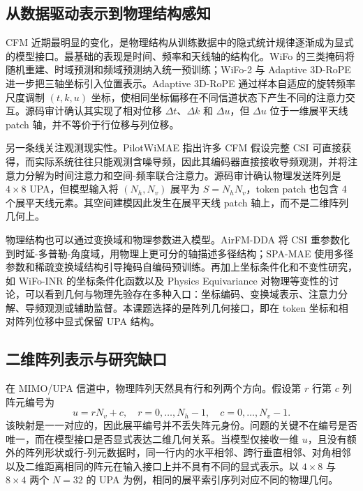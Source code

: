 \documentclass[journal]{IEEEtran}
\begin{document}
\subsection{从数据驱动表示到物理结构感知}

CFM 近期最明显的变化，是物理结构从训练数据中的隐式统计规律逐渐成为显式的模型接口。最基础的表现是时间、频率和天线轴的结构化。WiFo 的三类掩码将随机重建、时域预测和频域预测纳入统一预训练；WiFo-2 与 Adaptive 3D-RoPE 进一步把三轴坐标引入位置表示。Adaptive 3D-RoPE \cite{zhang2026adaptive3drope} 通过样本自适应的旋转频率尺度调制 \((t,k,u)\) 坐标，使相同坐标偏移在不同信道状态下产生不同的注意力交互。源码审计确认其实现了相对位移 \(\Delta t\)、\(\Delta k\) 和 \(\Delta u\)，但 \(\Delta u\) 位于一维展平天线 patch 轴，并不等价于行位移与列位移。

另一条线关注观测现实性。PilotWiMAE \cite{guler2026pilotwimae} 指出许多 CFM 假设完整 CSI 可直接获得，而实际系统往往只能观测含噪导频，因此其编码器直接接收导频观测，并将注意力分解为时间注意力和空间-频率联合注意力。源码审计确认物理发送阵列是 \(4\times 8\) UPA，但模型输入将 \((N_h,N_v)\) 展平为 \(S=N_hN_v\)，token patch 也包含 4 个展平天线元素。其空间建模因此发生在展平天线 patch 轴上，而不是二维阵列几何上。

物理结构也可以通过变换域和物理参数进入模型。AirFM-DDA \cite{bian2026airfmdda} 将 CSI 重参数化到时延-多普勒-角度域，用物理上更可分的轴描述多径结构；SPA-MAE \cite{chen2026spamae} 使用多径参数和稀疏变换域结构引导掩码自编码预训练。再加上坐标条件化和不变性研究，如 WiFo-INR \cite{liu2026wifoinr} 的坐标条件化函数以及 Physics Equivariance \cite{wang2026physicseq} 对物理等变性的讨论，可以看到几何与物理先验存在多种入口：坐标编码、变换域表示、注意力分解、导频观测或辅助监督。本课题选择的是阵列几何接口，即在 token 坐标和相对阵列位移中显式保留 UPA 结构。

\subsection{二维阵列表示与研究缺口}

在 MIMO/UPA 信道中，物理阵列天然具有行和列两个方向。假设第 \(r\) 行第 \(c\) 列阵元编号为
\begin{equation}
u=rN_v+c,\quad r=0,\ldots,N_h-1,\quad c=0,\ldots,N_v-1.
\label{eq:flatten}
\end{equation}
该映射是一一对应的，因此展平编号并不丢失阵元身份。问题的关键不在编号是否唯一，而在模型接口是否显式表达二维几何关系。当模型仅接收一维 \(u\)，且没有额外的阵列形状或行-列元数据时，同一行内的水平相邻、跨行垂直相邻、对角相邻以及二维距离相同的阵元在输入接口上并不具有不同的显式表示。以 \(4\times8\) 与 \(8\times4\) 两个 \(N=32\) 的 UPA 为例，相同的展平索引序列对应不同的物理几何。
\end{document}
